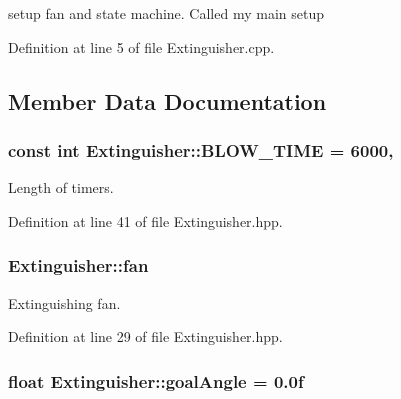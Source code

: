 setup fan and state machine. Called my main setup 



Definition at line 5 of file Extinguisher.\-cpp.



\subsection{Member Data Documentation}
\hypertarget{classExtinguisher_a454a63d5013db7cec4e5ae18fbfe64fa}{
\subsubsection[{B\-L\-O\-W\-\_\-\-T\-I\-M\-E}]{\setlength{\rightskip}{0pt plus 5cm}const int Extinguisher\-::\-B\-L\-O\-W\-\_\-\-T\-I\-M\-E = 6000\hspace{0.3cm}{\ttfamily [static]}, {\ttfamily [private]}}}\label{classExtinguisher_a454a63d5013db7cec4e5ae18fbfe64fa}


Length of timers. 



Definition at line 41 of file Extinguisher.\-hpp.

\hypertarget{classExtinguisher_a47ec6f79ddc26b18bbc1a0ac9741ae24}{
\subsubsection[{fan}]{ Extinguisher\-::fan\hspace{0.3cm}{\ttfamily [private]}}}\label{classExtinguisher_a47ec6f79ddc26b18bbc1a0ac9741ae24}


Extinguishing fan. 



Definition at line 29 of file Extinguisher.\-hpp.

\hypertarget{classExtinguisher_af7b156761cc23a5bee07f3cecd50213a}{
\subsubsection[{goal\-Angle}]{\setlength{\rightskip}{0pt plus 5cm}float Extinguisher\-::goal\-Angle = 0.\-0f\hspace{0.3cm}{\ttfamily [private]}}}\label{classExtinguisher_af7b156761cc23a5bee07f3cecd50213a}


